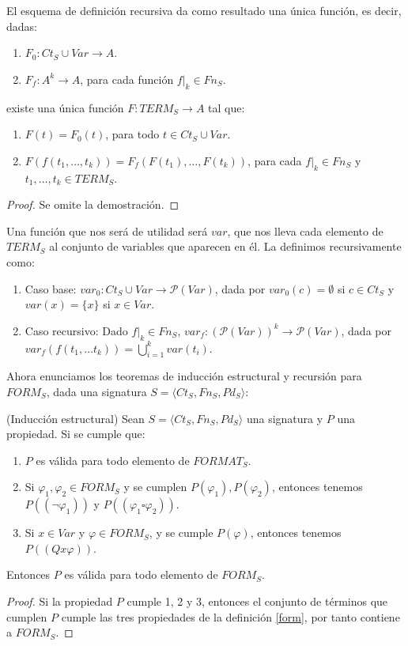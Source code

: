  \begin{prop} El esquema de definición recursiva da como resultado una única función, es decir, dadas:
\begin{enumerate}
    \item $F_0: Ct_S \cup Var \rightarrow A$.
    \item $F_f: A^{k} \rightarrow A$, para cada función $f|_{k} \in Fn_S$.
\end{enumerate}
existe una única función $F: TERM_S \rightarrow A$ tal que:
\begin{enumerate}
    \item $F(t)=F_0(t)$, para todo $t\in Ct_S \cup Var$.
    \item $F(f(t_1,\dots,t_k))=F_f(F(t_1),\dots,F(t_k))$, para cada $f|_{k} \in Fn_S$ y $t_1,\dots,t_k\in TERM_S$.
\end{enumerate}
\begin{proof}
Se omite la demostración.
\end{proof}
\end{prop}


\begin{example}
Una función que nos será de utilidad será $var$, que nos lleva cada elemento de $TERM_S$ al conjunto de variables que aparecen en él. La definimos recursivamente como:
\begin{enumerate}
    \item Caso base: $var_{0}: Ct_S \cup Var \rightarrow \mathcal{P} (Var)$, dada por $var_{0}(c) = \emptyset$ si $c \in Ct_S$ y $var(x) = \{x\}$ si $x \in Var$.
    \item Caso recursivo: Dado $f|_{k} \in Fn_S$, $var_{f}: (\mathcal{P} (Var))^{k} \rightarrow \mathcal{P} (Var)$, dada por $var_{f}(f(t_1, \dots t_k)) = \bigcup\limits_{i = 1}^{k} var(t_i)$.
\end{enumerate}
\end{example}


Ahora enunciamos los teoremas de inducción estructural y recursión para $FORM_S$, dada una signatura $S = \langle Ct_{S}, Fn_{S}, Pd_{S}\rangle$:

\begin{prop}(Inducción estructural)
Sean $S = \langle Ct_{S}, Fn_{S}, Pd_{S}\rangle$ una signatura y $P$ una propiedad. Si se cumple que:
\begin{enumerate}
    \item $P$ es válida para todo elemento de $FORMAT_S$.
    \item Si $\varphi_1, \varphi_2 \in FORM_S$ y se cumplen $P(\varphi_1),P(\varphi_2)$, entonces tenemos $P((\neg \varphi_1))$ y  $P((\varphi_1 \square \varphi_2))$.
    \item Si $x \in Var$ y $\varphi \in FORM_S$, y se cumple $P(\varphi)$, entonces tenemos $P((Q x \varphi))$.
\end{enumerate}
Entonces $P$ es válida para todo elemento de $FORM_S$.
\end{prop}
\begin{proof}
Si la propiedad $P$ cumple 1, 2 y 3, entonces el conjunto de términos que cumplen $P$ cumple las tres propiedades de la definición \ref{form}, por tanto contiene a $FORM_S$.
\end{proof}

